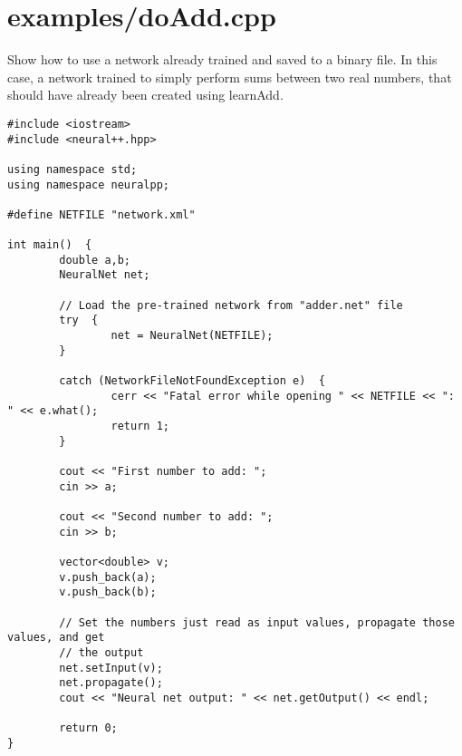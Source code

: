 \section{examples/doAdd.cpp}
Show how to use a network already trained and saved to a binary file. In this case, a network trained to simply perform sums between two real numbers, that should have already been created using learnAdd.



\begin{DocInclude}\begin{verbatim}
#include <iostream>
#include <neural++.hpp>

using namespace std;
using namespace neuralpp;

#define NETFILE "network.xml"

int main()  {
        double a,b;
        NeuralNet net;

        // Load the pre-trained network from "adder.net" file
        try  {
                net = NeuralNet(NETFILE);
        }

        catch (NetworkFileNotFoundException e)  {
                cerr << "Fatal error while opening " << NETFILE << ": " << e.what();
                return 1;
        }

        cout << "First number to add: ";
        cin >> a;

        cout << "Second number to add: ";
        cin >> b;

        vector<double> v;
        v.push_back(a);
        v.push_back(b);

        // Set the numbers just read as input values, propagate those values, and get
        // the output
        net.setInput(v);
        net.propagate();
        cout << "Neural net output: " << net.getOutput() << endl;

        return 0;
}

\end{verbatim}
\end{DocInclude}
 